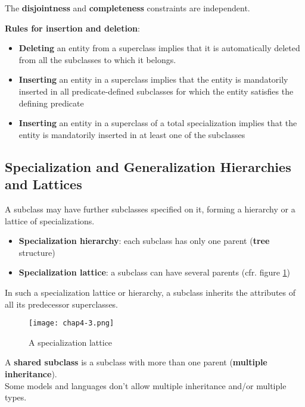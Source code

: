 The \textbf{disjointness} and \textbf{completeness} constraints are independent.

\textbf{Rules for insertion and deletion}:\\

\begin{itemize}
    \item \textbf{Deleting} an entity from a superclass implies that it is automatically deleted from all the subclasses to which it belongs.
    \item \textbf{Inserting} an entity in a superclass implies that the entity is mandatorily inserted in all predicate-defined  subclasses for which the entity satisfies the defining predicate
    \item \textbf{Inserting} an entity in a superclass of a total specialization implies that the entity is mandatorily inserted in at least one of the subclasses
\end{itemize}

\subsection{Specialization and Generalization Hierarchies and Lattices}

A subclass may have further subclasses specified on it, forming a hierarchy or a lattice of specializations.\\

\begin{itemize}
    \item \textbf{Specialization hierarchy}: each subclass has only one parent (\textbf{tree} structure)
    \item \textbf{Specialization lattice}: a subclass can have several parents (cfr. figure \ref{fig:lattice})
\end{itemize}

In such a specialization lattice or hierarchy, a subclass inherits the attributes of all its predecessor superclasses.\\

\begin{figure}[!h]
    \centering
    \texttt{[image: chap4-3.png]}
    \caption{A specialization lattice}
    \label{fig:lattice}
\end{figure}

A \textbf{shared subclass} is a subclass with more than one parent (\textbf{multiple inheritance}).\\

Some models and languages don't allow multiple inheritance and/or multiple types.

